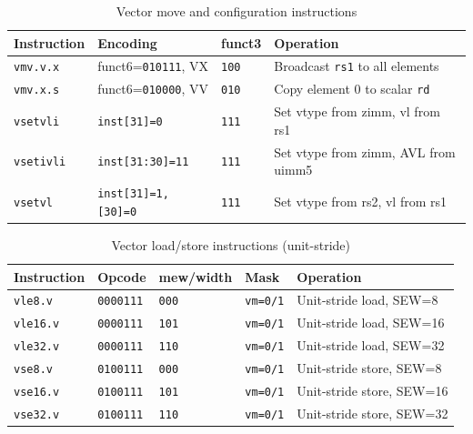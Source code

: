 \begin{table}[H]
  \centering
  \caption{Vector move and configuration instructions}
  \label{tab:instr-cfg}
  \begin{tabular}{@{}llll@{}}
    \toprule
    \textbf{Instruction}  & \textbf{Encoding} & \textbf{funct3} & \textbf{Operation} \\
    \midrule
    \texttt{vmv.v.x}      & funct6=\texttt{010111}, VX & \texttt{100} & Broadcast \texttt{rs1} to all elements \\
    \texttt{vmv.x.s}      & funct6=\texttt{010000}, VV & \texttt{010} & Copy element 0 to scalar \texttt{rd} \\
    \texttt{vsetvli}      & \texttt{inst[31]=0} & \texttt{111} & Set vtype from zimm, vl from rs1 \\
    \texttt{vsetivli}     & \texttt{inst[31:30]=11} & \texttt{111} & Set vtype from zimm, AVL from uimm5 \\
    \texttt{vsetvl}       & \texttt{inst[31]=1, [30]=0} & \texttt{111} & Set vtype from rs2, vl from rs1 \\
    \bottomrule
  \end{tabular}
\end{table}

\begin{table}[H]
  \centering
  \caption{Vector load/store instructions (unit-stride)}
  \label{tab:instr-lsu}
  \begin{tabular}{@{}lllll@{}}
    \toprule
    \textbf{Instruction} & \textbf{Opcode} & \textbf{mew/width} & \textbf{Mask} & \textbf{Operation} \\
    \midrule
    \texttt{vle8.v}  & \texttt{0000111} & \texttt{000} & \texttt{vm=0/1} & Unit-stride load, SEW=8  \\
    \texttt{vle16.v} & \texttt{0000111} & \texttt{101} & \texttt{vm=0/1} & Unit-stride load, SEW=16 \\
    \texttt{vle32.v} & \texttt{0000111} & \texttt{110} & \texttt{vm=0/1} & Unit-stride load, SEW=32 \\
    \texttt{vse8.v}  & \texttt{0100111} & \texttt{000} & \texttt{vm=0/1} & Unit-stride store, SEW=8  \\
    \texttt{vse16.v} & \texttt{0100111} & \texttt{101} & \texttt{vm=0/1} & Unit-stride store, SEW=16 \\
    \texttt{vse32.v} & \texttt{0100111} & \texttt{110} & \texttt{vm=0/1} & Unit-stride store, SEW=32 \\
    \bottomrule
  \end{tabular}
\end{table}

